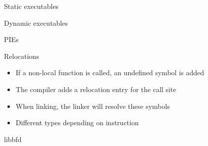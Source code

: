 \documentclass{beamer}
\begin{document}
\begin{frame}{Static executables}

\end{frame}

\begin{frame}{Dynamic executables}
\end{frame}

\begin{frame}{PIEs}
\end{frame}

\begin{frame}{Relocations}
  \begin{itemize}
    \item If a non-local function is called, an undefined symbol is added
    \item The compiler adds a relocation entry for the call site
    \item When linking, the linker will resolve these symbols
    \item Different types depending on instruction
  \end{itemize}

\end{frame}

\begin{frame}{libbfd}

  \end{frame}
\end{document}
